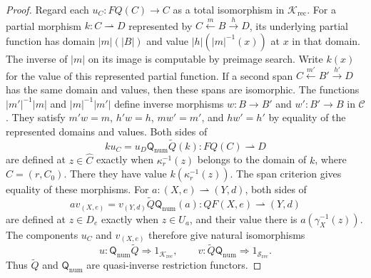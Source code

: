 \begin{proof}
Regard each $u_C:FQ(C)\to C$ as a total isomorphism in
$\mathcal K_{\mathrm{rec}}$. For a partial morphism $k:C\rightharpoonup D$
represented by $C\xleftarrow{m}B\xrightarrow{h}D$, its underlying
partial function has domain $|m|(|B|)$ and value
$|h|(|m|^{-1}(x))$ at $x$ in that domain. The inverse of $|m|$
on its image is computable by preimage search. Write $k(x)$ for
the value of this represented partial function. If a second span
$C\xleftarrow{m'}B'\xrightarrow{h'}D$ has the same domain and values,
then these spans are isomorphic. The functions $|m'|^{-1}|m|$ and $|m|^{-1}|m'|$
define inverse morphisms $w:B\to B'$ and $w':B'\to B$ in
$\mathcal C$. They satisfy $m'w=m$, $h'w=h$, $mw'=m'$, and
$hw'=h'$ by equality of the represented domains and values.
Both sides of
\[
 k u_C=u_D\mathsf Q_{\mathrm{num}}\widetilde Q(k)
       :FQ(C)\rightharpoonup D
\]
are defined at $z\in\widehat C$ exactly when
$\kappa_r^{-1}(z)$ belongs to the domain of $k$, where $C=(r,C_0)$.
There they have value $k(\kappa_r^{-1}(z))$. The span criterion gives equality of these morphisms.
For $a:(X,e)\rightharpoonup(Y,d)$, both sides of
\[
 a v_{(X,e)}
   =v_{(Y,d)}\widetilde Q\mathsf Q_{\mathrm{num}}(a)
   :QF(X,e)\rightharpoonup(Y,d)
\]
are defined at $z\in D_e$ exactly when $z\in U_a$, and their
value there is $a(\gamma_X^{-1}(z))$.
The components $u_C$ and $v_{(X,e)}$ therefore give natural
isomorphisms
\[
 u:\mathsf Q_{\mathrm{num}}\widetilde Q
             \Rightarrow1_{\mathcal K_{\mathrm{rec}}},\qquad
 v:\widetilde Q\mathsf Q_{\mathrm{num}}
             \Rightarrow1_{\mathscr S_{\mathrm{rec}}}.
\]
Thus $\widetilde Q$ and $\mathsf Q_{\mathrm{num}}$ are
quasi-inverse restriction functors.
\end{proof}

